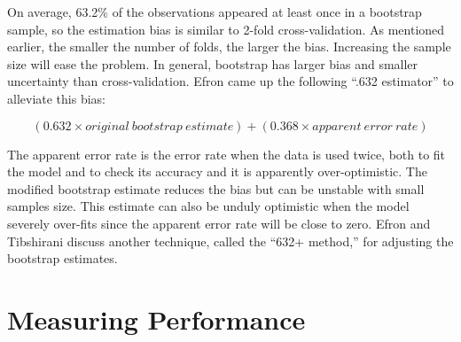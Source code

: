 \documentclass[12pt,]{krantz}
\theoremstyle{definition}
\theoremstyle{definition}
\theoremstyle{remark}
\begin{document}
On average, 63.2\% of the observations appeared at least once in a
bootstrap sample, so the estimation bias is similar to 2-fold
cross-validation. As mentioned earlier, the smaller the number of folds,
the larger the bias. Increasing the sample size will ease the problem.
In general, bootstrap has larger bias and smaller uncertainty than
cross-validation. Efron came up the following ``.632 estimator'' to
alleviate this bias:

\[(0.632 × original\ bootstrap\ estimate) + (0.368 × apparent\ error\ rate)\]

The apparent error rate is the error rate when the data is used twice,
both to fit the model and to check its accuracy and it is apparently
over-optimistic. The modified bootstrap estimate reduces the bias but
can be unstable with small samples size. This estimate can also be
unduly optimistic when the model severely over-fits since the apparent
error rate will be close to zero. Efron and Tibshirani \citep{b632plus}
discuss another technique, called the ``632+ method,'' for adjusting the
bootstrap estimates.

\chapter{Measuring Performance}\label{measuring-performance}



\backmatter
\printindex
\end{document}
